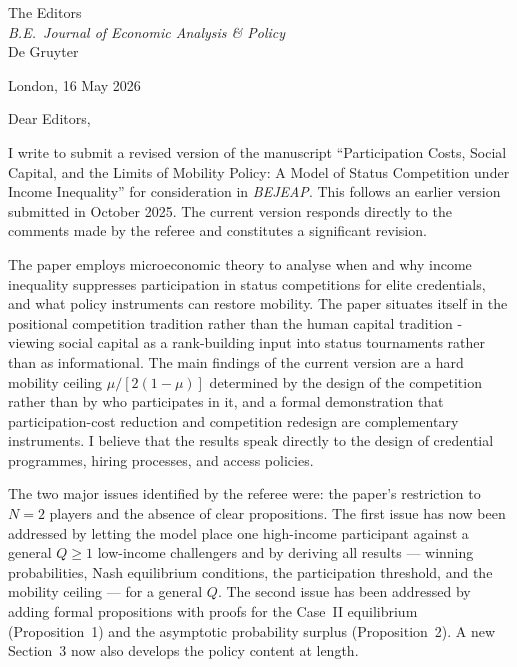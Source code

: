 \documentclass[11pt]{article}
\begin{document}
\noindent
The Editors\\
\textit{B.E.\ Journal of Economic Analysis \& Policy}\\
De Gruyter

\bigskip
\noindent
London, 16 May 2026

\bigskip
\noindent
Dear Editors,

\medskip

I write to submit a revised version of the manuscript
``Participation Costs, Social Capital, and the Limits of Mobility
Policy: A Model of Status Competition under Income Inequality''
for consideration in \textit{BEJEAP}. This follows an earlier version 
submitted in October 2025. The current version
responds directly to the comments made by the referee and constitutes a significant revision.

The paper employs microeconomic theory to analyse when and why
income inequality suppresses participation in status competitions
for elite credentials, and what policy instruments can restore
mobility. The paper situates itself in the positional competition tradition
rather than the human capital tradition - viewing social capital as a
rank-building input into status tournaments rather than
as informational. The main findings of the current version are a hard mobility ceiling
$\mu/[2(1-\mu)]$ determined by the design of the
competition rather than by who participates in it, and a formal
demonstration that participation-cost reduction and competition
redesign are complementary instruments. I believe that the results speak directly to the design of
credential programmes, hiring processes, and access policies.

The two major issues identified by the referee were: the paper's restriction to
$N=2$ players and the absence of clear propositions. The first issue has now been addressed by letting the model place one high-income participant against a general $Q \geq 1$ low-income challengers and by deriving all results --- winning
probabilities, Nash equilibrium conditions, the participation
threshold, and the mobility ceiling --- for a general $Q$. The second issue has been addressed by adding formal propositions with proofs for the Case~II equilibrium (Proposition~1) and the asymptotic probability surplus (Proposition~2). A new Section~3 now also develops the policy content at length.
\end{document}
